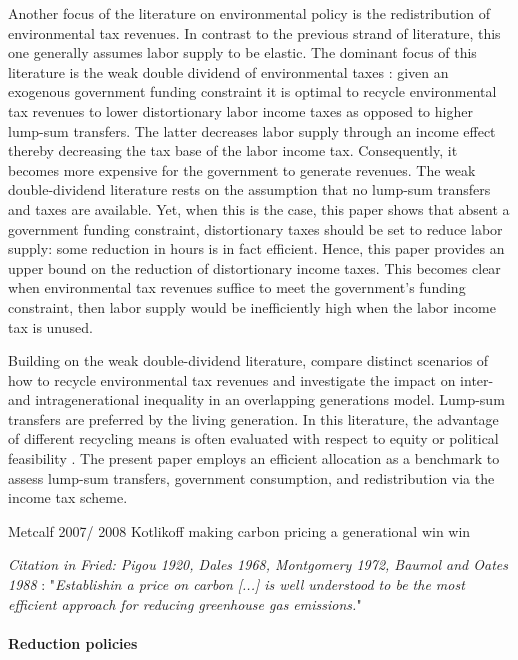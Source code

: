 Another focus of the literature on environmental policy is the redistribution of environmental tax revenues. In contrast to the previous strand of literature, this one generally assumes labor supply to be elastic. 
The dominant focus of this literature is the weak double dividend of environmental taxes \citep{LansBovenberg1994EnvironmentalTaxation, LansBovenberg1996OptimalAnalyses, Bovenberg2002EnvironmentalRegulation,  Barrage2019OptimalPolicy}: given an exogenous government funding constraint it is optimal to recycle environmental tax revenues to lower distortionary labor income taxes as opposed to higher lump-sum transfers. The latter decreases labor supply through an income effect thereby decreasing the tax base of the labor income tax. Consequently, it becomes more expensive for the government to generate revenues.
The weak double-dividend literature rests on the assumption that no lump-sum transfers and taxes are available. Yet, when this is the case, this paper shows that absent a government funding constraint, distortionary taxes should be set to reduce labor supply: some reduction in hours is in fact efficient. Hence, this paper provides an upper bound on the reduction of distortionary income taxes. This becomes clear when environmental tax revenues suffice to meet the government's funding constraint, then labor supply would be inefficiently high when the labor income tax is unused.

Building on the weak double-dividend literature, \cite{Fried2018TheGenerations} compare distinct scenarios of how to recycle environmental tax revenues and investigate the impact on inter- and intragenerational inequality in an overlapping generations model. Lump-sum transfers are preferred by the  living generation. 
In this literature, the advantage of different recycling means is often evaluated with respect to equity or political feasibility \cite{Carattini2018, VANDERPLOEG2022103966}. The present paper employs an efficient allocation as a benchmark to assess lump-sum transfers, government consumption, and redistribution via the income tax scheme. 

Metcalf 2007/ 2008
Kotlikoff making carbon pricing a generational win win

\textit{Citation in Fried: Pigou 1920, Dales 1968, Montgomery 1972, Baumol and Oates 1988 }: "\textit{Establishin a price on carbon [...] is well understood to be the most efficient approach for reducing greenhouse gas emissions.}"

\paragraph{Reduction policies}